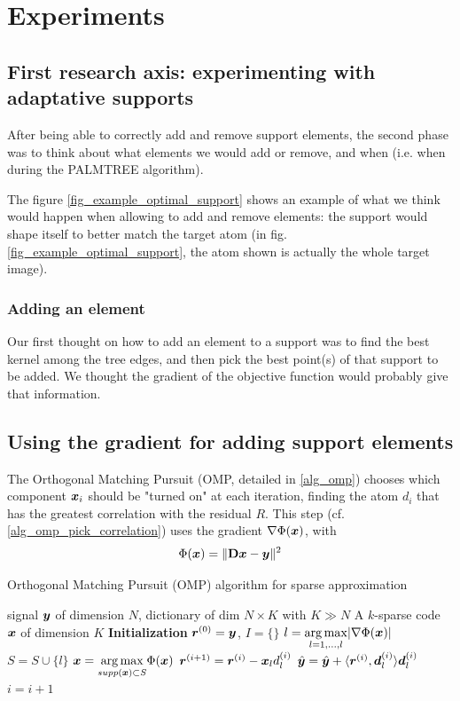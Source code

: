 \chapter{Experiments}

\section{First research axis: experimenting with adaptative supports}

After being able to correctly add and remove support elements, the second phase was to think about what elements we would add or remove, and when (i.e. when during the PALMTREE algorithm).

The figure \ref{fig_example_optimal_support} shows an example of what we think would happen when allowing to add and remove elements: the support would shape itself to better match the target atom (in fig.\ref{fig_example_optimal_support}, the atom shown is actually the whole target image).


\subsection{Adding an element}
Our first thought on how to add an element to a support was to find the best kernel among the tree edges, and then pick the best point(s) of that support to be added. We thought the gradient of the objective function would probably give that information. 







\section{Using the gradient for adding support elements}

The Orthogonal Matching Pursuit (OMP, detailed in \cref{alg_omp}) chooses which component $\bm{x}_i$ should be "turned on" at each iteration, finding the atom $d_i$ that has the greatest correlation with the residual $R$. This step (cf. \cref{alg_omp_pick_correlation}) uses the gradient $\nabla \Phi(\bm{x})$, with $$\Phi(\bm{x}) = \lVert \mathbf{D}\bm{x} - \bm{y} \rVert^2$$


\begin{algorithm}[!ht]
    \caption{Orthogonal Matching Pursuit (OMP) algorithm for sparse approximation}\label{alg_omp}
  \begin{algorithmic}[1]
    \Input signal $\bm{y}$ of dimension $N$, dictionary of dim $N \times K$ with $K \gg N$
    \Output A $k$-sparse code $\bm{x}$ of dimension $K$
    \State \textbf{Initialization} $\bm{r}^{(0)} = \bm{y}$, $I=\{\}$
      \State $l =  \underset{l = 1,\dots,l}{\arg\max} | \nabla \Phi(\bm{x}) |$ \label{alg_omp_pick_correlation}
      \State $S = S \cup \{l\}$
      \State $\bm{x} = \underset{supp(\bm{x}) \subset S}{\arg\max} \Phi(\bm{x})$
      \State $\bm{r}^{(i+1)} = \bm{r}^{(i)}-\bm{x}_l d_l^{(i)}$
      \State $\hat{\bm{y}} = \hat{\bm{y}}+\langle \bm{r}^{(i)}, \bm{d}_{l}^{(i)} \rangle \bm{d}_{l}^{(i)}$
      \State $i = i + 1$
    \EndWhile
  \end{algorithmic}
\end{algorithm}

